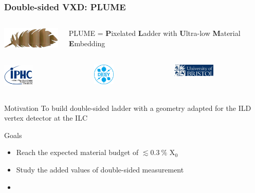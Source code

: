 \documentclass{beamer}
\begin{document}
\begin{frame}
  \frametitle{Double-sided VXD: PLUME}

  \begin{columns}[c]
    \begin{column}{3cm}
      \includegraphics[width = 3cm]{Pictures/logo_plume.png}
    \end{column}
    \vspace{-0.2cm}
    \begin{column}{7cm}
      PLUME = \textbf{P}ixelated \textbf{L}adder with \textbf{U}ltra-low \textbf{M}aterial \textbf{E}mbedding
    \end{column}
  \end{columns}

  \begin{columns}[t]
    \begin{column}{1cm}
      \includegraphics[width = 1.5cm]{Pictures/logo_IPHC_10cm.png}
    \end{column}
    \begin{column}{1cm}
      \includegraphics[width = 1cm]{Pictures/DESY-Logo.png}
    \end{column}
    \begin{column}{1cm}
      \includegraphics[width = 2cm]{Pictures/logo_uni_bristol.jpg}
    \end{column}
  \end{columns}

  \vspace{-0.15cm}

  \begin{block}{Motivation}
    To build double-sided ladder with a geometry adapted for the ILD vertex detector at the ILC
  \end{block}

  \begin{block}{Goals}
    \begin{itemize}
      \item Reach the expected material budget of $ \lesssim 0.3~\%$ X$_0$
      \item Study the added values of double-sided measurement
      \item {} 
    \end{itemize}
  \end{block}


\end{frame}
\end{document}
